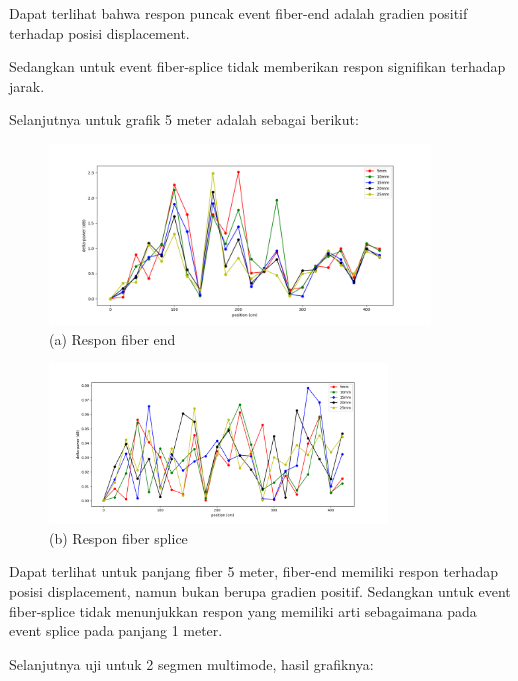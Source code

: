 \documentclass[12pt]{article}
\begin{document}
	\newpage
	Dapat terlihat bahwa respon puncak event fiber-end adalah gradien positif terhadap posisi displacement.
	
	Sedangkan untuk event fiber-splice tidak memberikan respon signifikan terhadap jarak.

	Selanjutnya untuk grafik 5 meter adalah sebagai berikut:
	
	\begin{figure}[!h]
		\centering
		\captionsetup{justification=centering}
		\includegraphics[width=0.9\textwidth]{images/Bab_4/Bab_4_5g1}	
		\caption{\small{(a) Respon fiber end}}
	\end{figure}
	
	\begin{figure}[!h]
		\centering
		\captionsetup{justification=centering}
		\includegraphics[width=0.8\textwidth]{images/Bab_4/Bab_4_5g2}	
		\caption{\small{(b) Respon fiber splice}}
	\end{figure}

	Dapat terlihat untuk panjang fiber 5 meter, fiber-end memiliki respon terhadap posisi displacement, namun bukan berupa gradien positif. 
	Sedangkan untuk event fiber-splice tidak menunjukkan respon yang memiliki arti sebagaimana pada event splice pada panjang 1 meter.
	
	Selanjutnya uji untuk 2 segmen multimode, hasil grafiknya:
	
\end{document}
